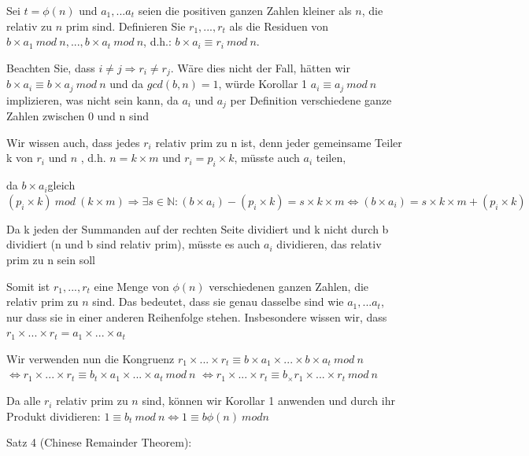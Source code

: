\documentclass[a4paper]{article}
\begin{document}
\begin{multicols}{3}
\begin{itemize*}
\begin{itemize*}
\begin{itemize*}
                        \item Sei $t=\phi(n)$ und $a_1,...a_t$ seien die positiven ganzen Zahlen kleiner als $n$, die relativ zu $n$ prim sind. Definieren Sie $r_1,...,r_t$ als die Residuen von $b\times a_1\ mod\ n , ..., b\times a_t\ mod\ n$, d.h.: $b\times a_i \equiv r_i\ mod\ n$.
                        \item Beachten Sie, dass $i\not= j \Rightarrow r_i\not= r_j$. Wäre dies nicht der Fall, hätten wir $b\times a_i\equiv b\times a_j\ mod\ n$ und da $gcd(b,n)=1$, würde Korollar 1 $a_i\equiv a_j\ mod\ n$ implizieren, was nicht sein kann, da $a_i$ und $a_j$ per Definition verschiedene ganze Zahlen zwischen 0 und n sind
                        \item Wir wissen auch, dass jedes $r_i$ relativ prim zu n ist, denn jeder gemeinsame Teiler k von $r_i$ und $n$ , d.h. $n=k\times m$ und $r_i=p_i\times k$, müsste auch $a_i$ teilen,
                        \item da $b\times a_i$gleich $(p_i\times k)\ mod\ (k\times m)\Rightarrow\exists s\in\mathbb{N}:(b\times a_i)-(p_i\times k)=s\times k\times m \Leftrightarrow (b\times a_i)=s\times k\times m+(p_i\times k)$
                        \item Da k jeden der Summanden auf der rechten Seite dividiert und k nicht durch b dividiert (n und b sind relativ prim), müsste es auch $a_i$ dividieren, das relativ prim zu n sein soll
                        \item Somit ist $r_1, ...,r_t$ eine Menge von $\phi(n)$ verschiedenen ganzen Zahlen, die relativ prim zu $n$ sind. Das bedeutet, dass sie genau dasselbe sind wie $a_1,...a_t$, nur dass sie in einer anderen Reihenfolge stehen. Insbesondere wissen wir, dass $r_1\times ...\times r_t=a_1\times ...\times a_t$
                        \item Wir verwenden nun die Kongruenz $r_1\times ...\times r_t\equiv b\times a_1\times ...\times b\times a_t\ mod\ n$ $\Leftrightarrow r_1\times ...\times r_t\equiv b_t\times a_1\times ...\times a_t\ mod\ n$ $\Leftrightarrow r_1\times ...\times r_t\equiv b_\times r_1\times ...\times r_t\ mod\ n$
                        \item Da alle $r_i$ relativ prim zu $n$ sind, können wir Korollar 1 anwenden und durch ihr Produkt dividieren: $1\equiv b_t\ mod\ n \Leftrightarrow 1\equiv b\phi(n)\ mod n$
                  \end{itemize*}
            \end{itemize*}
            \item Satz 4 (Chinese Remainder Theorem):

\end{itemize*}
\end{multicols}
\end{document}
